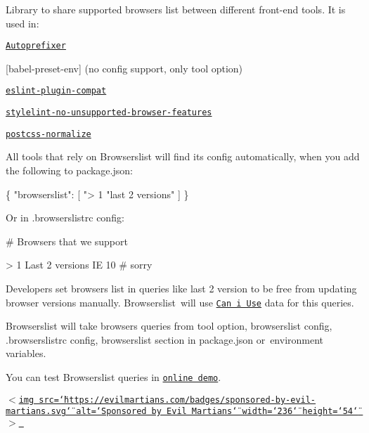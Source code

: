 

Library to share supported browsers list between different front-\/end tools. It is used in\+:


\begin{DoxyItemize}
\item \href{https://github.com/postcss/autoprefixer}{\tt Autoprefixer}
\item \mbox{[}babel-\/preset-\/env\mbox{]} (no config support, only tool option)
\item \href{https://github.com/amilajack/eslint-plugin-compat}{\tt eslint-\/plugin-\/compat}
\item \href{https://github.com/ismay/stylelint-no-unsupported-browser-features}{\tt stylelint-\/no-\/unsupported-\/browser-\/features}
\item \href{https://github.com/jonathantneal/postcss-normalize}{\tt postcss-\/normalize}
\end{DoxyItemize}

All tools that rely on Browserslist will find its config automatically, when you add the following to {\ttfamily package.\+json}\+:


\begin{DoxyCode}
\{
  "browserslist": [
    "> 1%
    "last 2 versions"
  ]
\}
\end{DoxyCode}


Or in {\ttfamily .browserslistrc} config\+:


\begin{DoxyCode}
# Browsers that we support

> 1%
Last 2 versions
IE 10 # sorry
\end{DoxyCode}


Developers set browsers list in queries like {\ttfamily last 2 version} to be free from updating browser versions manually. Browserslist will use \href{http://caniuse.com/}{\tt Can i Use} data for this queries.

Browserslist will take browsers queries from tool option, {\ttfamily browserslist} config, {\ttfamily .browserslistrc} config, {\ttfamily browserslist} section in {\ttfamily package.\+json} or environment variables.

You can test Browserslist queries in \href{http://browserl.ist/}{\tt online demo}.

\href{https://evilmartians.com/?utm_source=browserslist}{\tt $<$img src=\char`\"{}https\+://evilmartians.\+com/badges/sponsored-\/by-\/evil-\/martians.\+svg\char`\"{} alt=\char`\"{}\+Sponsored by Evil Martians\char`\"{} width=\char`\"{}236\char`\"{} height=\char`\"{}54\char`\"{} $>$ }

